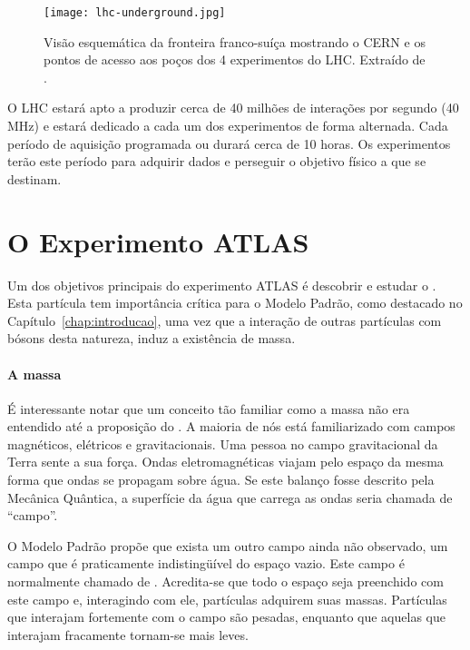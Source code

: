\begin{figure}
\begin{center}
\texttt{[image: lhc-underground.jpg]}
\end{center}
\caption{Visão esquemática da fronteira franco-suíça mostrando o CERN e os
pontos de acesso aos poços dos 4 experimentos do LHC. Extraído de
\cite{cern}.}
\label{fig:aerial}
\end{figure}

O LHC estará apto a produzir cerca de 40 milhões de interações por segundo (40
MHz) e estará dedicado a cada um dos experimentos de forma alternada. Cada
período de aquisição programada ou  durará cerca de 10 horas. Os
experimentos terão este período para adquirir dados e perseguir o objetivo
físico a que se destinam.

\section{O Experimento ATLAS}

Um dos objetivos principais do experimento ATLAS é descobrir e estudar o
. Esta partícula tem importância crítica para o Modelo
Padrão, como destacado no Capítulo~\ref{chap:introducao}, uma vez que a
interação de outras partículas com bósons desta natureza, induz a existência
de massa.

\paragraph{A massa} É interessante notar que um conceito tão
familiar como a massa não era entendido até a proposição do . A maioria de nós está familiarizado com campos magnéticos, elétricos
e gravitacionais. Uma pessoa no campo gravitacional da Terra sente a sua
força. Ondas eletromagnéticas viajam pelo espaço da mesma forma que ondas se
propagam sobre água. Se este balanço fosse descrito pela Mecânica Quântica, a
superfície da água que carrega as ondas seria chamada de ``campo''.

O Modelo Padrão propõe que exista um outro campo ainda não observado, um campo
que é praticamente indistingüível do espaço vazio. Este campo é normalmente
chamado de . Acredita-se que todo o espaço seja preenchido
com este campo e, interagindo com ele, partículas adquirem suas
massas. Partículas que interajam fortemente com o campo são pesadas, enquanto
que aquelas que interajam fracamente tornam-se mais leves.

